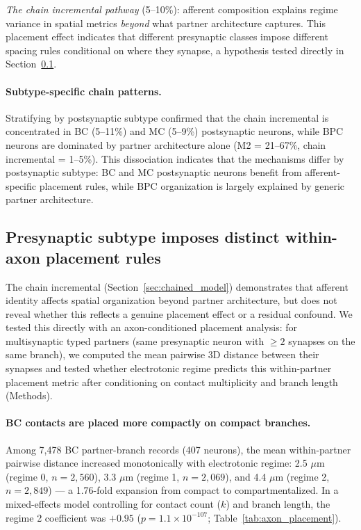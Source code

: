 \documentclass[11pt]{article}
\begin{document}
\textit{The chain incremental pathway} (5--10\%): afferent composition explains regime variance in spatial metrics \textit{beyond} what partner architecture captures. This placement effect indicates that different presynaptic classes impose different spacing rules conditional on where they synapse, a hypothesis tested directly in Section~\ref{sec:axon_placement}.

\paragraph{Subtype-specific chain patterns.} Stratifying by postsynaptic subtype confirmed that the chain incremental is concentrated in BC (5--11\%) and MC (5--9\%) postsynaptic neurons, while BPC neurons are dominated by partner architecture alone (M2 = 21--67\%, chain incremental = 1--5\%). This dissociation indicates that the mechanisms differ by postsynaptic subtype: BC and MC postsynaptic neurons benefit from afferent-specific placement rules, while BPC organization is largely explained by generic partner architecture.


\subsection{Presynaptic subtype imposes distinct within-axon placement rules}
\label{sec:axon_placement}

The chain incremental (Section~\ref{sec:chained_model}) demonstrates that afferent identity affects spatial organization beyond partner architecture, but does not reveal whether this reflects a genuine placement effect or a residual confound. We tested this directly with an axon-conditioned placement analysis: for multisynaptic typed partners (same presynaptic neuron with $\geq 2$ synapses on the same branch), we computed the mean pairwise 3D distance between their synapses and tested whether electrotonic regime predicts this within-partner placement metric after conditioning on contact multiplicity and branch length (Methods).

\paragraph{BC contacts are placed more compactly on compact branches.} Among 7,478 BC partner-branch records (407 neurons), the mean within-partner pairwise distance increased monotonically with electrotonic regime: 2.5 $\mu$m (regime 0, $n = 2{,}560$), 3.3 $\mu$m (regime 1, $n = 2{,}069$), and 4.4 $\mu$m (regime 2, $n = 2{,}849$) --- a 1.76-fold expansion from compact to compartmentalized. In a mixed-effects model controlling for contact count ($k$) and branch length, the regime 2 coefficient was $+0.95$ ($p = 1.1 \times 10^{-107}$; Table~\ref{tab:axon_placement}).
\end{document}
